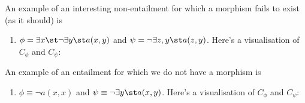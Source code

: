 \begin{enumerate}
  \begin{center}
    
  \end{center}
%
%
\end{enumerate}
%
An example of an interesting non-entailment for which a morphism fails to exist (as it should) is
%
\begin{enumerate}[resume]
\item{} $\phi=\exists x\st \neg\exists y\st a(x,y)$ and $\psi=\neg\exists z,y\st  a(z,y)$. Here's a visualisation of $C_\phi$ and $C_\psi$:
  
  \begin{center}
    
  \end{center}
\end{enumerate}
%
An example of an entailment for which we do not have a morphism is
%
\begin{enumerate}[resume]
\item{} $\phi\equiv \neg a(x,x)$ and $\psi\equiv \neg\exists y\st a(x,y)$. Here's a visualisation of $C_\phi$ and $C_\psi$:

  \begin{center}
    
  \end{center}
\end{enumerate}
